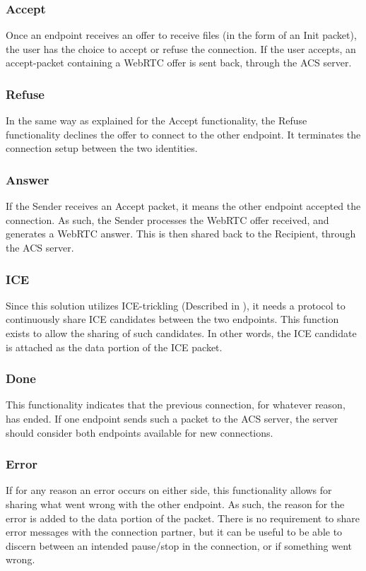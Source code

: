 	\subsubsection*{Accept}
	Once an endpoint receives an offer to receive files (in the form of an Init packet), the user has the choice to accept or refuse the connection. If the user accepts, an accept-packet containing a WebRTC offer is sent back, through the ACS server.

	\subsubsection*{Refuse}
	In the same way as explained for the Accept functionality, the Refuse functionality declines the offer to connect to the other endpoint. It terminates the connection setup between the two identities.

	\subsubsection*{Answer}
	If the Sender receives an Accept packet, it means the other endpoint accepted the connection. As such, the Sender processes the WebRTC offer received, and generates a WebRTC answer. This is then shared back to the Recipient, through the ACS server.

	\subsubsection*{ICE}
	Since this solution utilizes ICE-trickling (Described in ), it needs a protocol to continuously share ICE candidates between the two endpoints. This function exists to allow the sharing of such candidates. In other words, the ICE candidate is attached as the data portion of the ICE packet.

	\subsubsection*{Done}
	This functionality indicates that the previous connection, for whatever reason, has ended. If one endpoint sends such a packet to the ACS server, the server should consider both endpoints available for new connections.

	\subsubsection*{Error}
	If for any reason an error occurs on either side, this functionality allows for sharing what went wrong with the other endpoint. As such, the reason for the error is added to the data portion of the packet. There is no requirement to share error messages with the connection partner, but it can be useful to be able to discern between an intended pause/stop in the connection, or if something went wrong.

